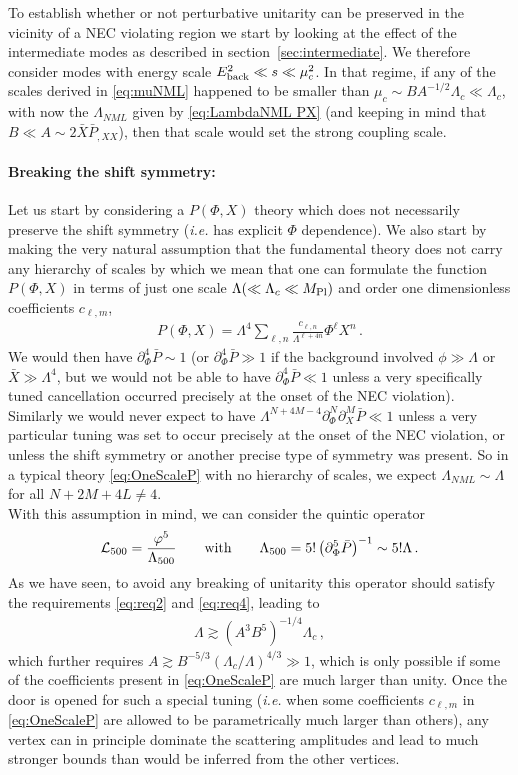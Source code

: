 \documentclass[12pt]{article}
\def\ba{\begin{eqnarray}}
\def\ea{\end{eqnarray}}
\def\mpl{M_{\rm Pl}}
\def\L{\mathcal{L}}
\def\({\left(}
\def\){\right)}
\def\ie{{\it i.e. }}
\def\p{\partial}
\def\p{\partial}
\begin{document}
To establish whether or not perturbative unitarity can be preserved in the vicinity of a NEC violating region we start by looking at the effect of the intermediate modes as described in section~\ref{sec:intermediate}. We therefore consider modes with energy scale $E_{\rm back}^2\ll s \ll \mu_c^2$. In that regime, if any of the scales derived in \eqref{eq:muNML} happened to be smaller than $\mu_c\sim B A^{-1/2} \Lambda_c \ll \Lambda_c$, with now the $\Lambda_{NML}$ given by \eqref{eq:LambdaNML PX} (and keeping in mind that $B\ll A \sim 2 \bar X \bar P_{,XX}$), then that scale would set the strong coupling scale. \\

\paragraph{Breaking the shift symmetry:}

Let us start by considering a $P(\Phi,X)$ theory which does not necessarily preserve the shift symmetry (\ie has explicit $\Phi$ dependence).  We also start by  making the very natural assumption   that the fundamental theory does not carry any hierarchy of scales by which we mean that  one can formulate the function $P(\Phi,X)$ in terms of just one scale $\Lambda (\ll \Lambda_c \ll \mpl )$ and order one dimensionless coefficients $c_{\ell,m}$,
\ba
\label{eq:OneScaleP}
P(\Phi,X)=\Lambda^4\sum_{\ell, n} \frac{c_{\ell,n}}{\Lambda^{\ell+4n}}\Phi^\ell X^n\,.
\ea
We would then have $\p^4_\Phi \bar {P} \sim 1$ (or $\p^4_\Phi \bar {P} \gg 1$ if the background involved $\phi\gg \Lambda$ or $\bar X\gg \Lambda^4$, but we would not be able to have $\p^4_\Phi \bar {P} \ll 1$  unless a very specifically tuned cancellation occurred precisely at the onset of the NEC violation). Similarly we would never expect to have $\Lambda^{N+4M-4}\p_\Phi^N\p_X^M \bar P \ll 1$ unless a very particular tuning was set to occur precisely at the onset of the NEC violation, or unless the shift symmetry or another precise type of symmetry was present. So in a typical theory \eqref{eq:OneScaleP} with no hierarchy of scales, we expect $\Lambda_{NML}\sim \Lambda$ for all $N+2 M+4 L\ne 4$.\\

With this assumption in mind, we can consider the quintic operator
\ba
\L_{500}= \frac{\varphi^5}{\Lambda_{500}}\qquad{\rm with}\qquad \Lambda_{500}=5! \( \p_\Phi^5 \bar P\)^{-1}\sim 5! \Lambda\,.
\ea
As we have seen, to avoid any breaking of unitarity this operator should satisfy the requirements \eqref{eq:req2} and \eqref{eq:req4}, leading to
\ba
 \Lambda \gtrsim (A^3 B^5)^{-1/4} \Lambda_c \,,
\ea
which further requires $A \gtrsim B^{-5/3} (\Lambda_c/\Lambda)^{4/3} \gg 1$, which is only possible if some of the coefficients present in  \eqref{eq:OneScaleP} are much larger than unity.
Once the door is opened for such a special tuning (\ie when some coefficients $c_{\ell, m}$ in \eqref{eq:OneScaleP} are allowed to be parametrically much larger than others), any vertex can in principle dominate the scattering amplitudes and lead to much stronger bounds than would be inferred from the other vertices.
\end{document}
